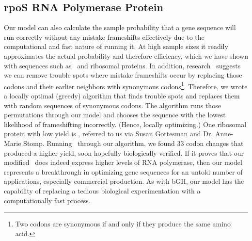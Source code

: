 \documentclass[12pt, draft]{article}
\numberwithin{equation}{section}
\begin{document}
\subsection{rpoS RNA Polymerase Protein}
Our model can also calculate the sample probability that a gene sequence will run correctly without any mistake frameshifts
effectively due to the computational and fast nature of running it.
At high sample sizes it readily approximates the actual probability and therefore efficiency, which we have shown with sequences such as
\prfB\ and ribosomal proteins. In addition, research~\cite{rare:yield}
suggests we can remove trouble spots where mistake frameshifts occur by replacing those codons and their
earlier neighbors with synonymous codons\footnote{Two codons are synonymous if and only if they produce the same amino acid.}.
Therefore, we wrote a locally optimal (greedy) algorithm that finds trouble spots and replaces them with random sequences
of synonymous codons. The algorithm runs those permutations through our model and chooses the
sequence with the lowest likelihood of frameshifting incorrectly. (Hence, locally optimizing.) One ribosomal protein with
low yield is \rpoS, referred to us via Susan Gottesman and Dr. Anne-Marie Stomp.
Running \rpoS\ through our algorithm, we found 33 codon changes that produced a higher yield, soon hopefully biologically verified.
If it proves that our modified \rpoS\ does indeed express higher levels
of RNA polymerase, then our model represents a breakthrough in optimizing gene sequences for an untold number of  applications,
especially commercial production. As with bGH, our model has the capability of replacing a tedious biological experimentation
with a computationally fast process.

\footnotesize
\begin{singlespace}
  
\end{singlespace}
\end{document}
